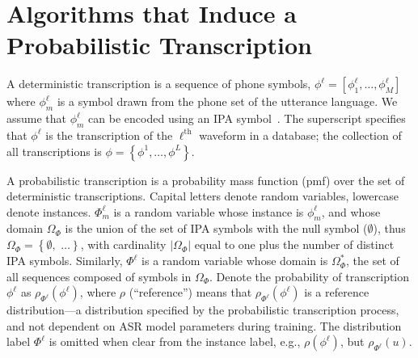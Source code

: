 \section{Algorithms that Induce a Probabilistic Transcription}

A deterministic transcription is a sequence of phone symbols,
$\phi^\ell =[\phi_1^\ell,\ldots,\phi_M^\ell]$ where $\phi_m^\ell$ is a
symbol drawn from the phone set of the utterance language.  We assume
that $\phi_m^\ell$ can be encoded using an IPA symbol~\cite{ipa1993}.
The superscript specifies that $\phi^\ell$ is the transcription of the
$\ell^{\textrm{th}}$ waveform in a database; the collection of all
transcriptions is $\phi=\left\{\phi^1,\ldots,\phi^L\right\}$.

A probabilistic transcription is a probability mass function (pmf)
over the set of deterministic transcriptions.  Capital letters denote
random variables, lowercase denote instances.  $\Phi^{\ell}_m$ is a
random variable whose instance is $\phi_m^\ell$, and whose domain
$\Omega_\Phi$ is the union of the set of IPA symbols with the null
symbol ($\emptyset$), thus $\Omega_\Phi=\left\{\right.\emptyset,$
\ipa{[a],[i],[2],[\ae],}$\left.\ldots\right\}$, with cardinality
$|\Omega_\Phi|$ equal to one plus the number of distinct IPA symbols.
Similarly, $\Phi^{\ell}$ is a random variable whose domain is
$\Omega_\Phi^*$, the set of all sequences composed of symbols in
$\Omega_\Phi$.  Denote the probability of transcription $\phi^{\ell}$
as $\rho_{\Phi^\ell}(\phi^{\ell})$, where $\rho$ (``reference'') means
that $\rho_{\Phi^\ell}(\phi^{\ell})$ is a reference distribution---a
distribution specified by the probabilistic transcription process, and
not dependent on ASR model parameters during training.  The
distribution label $\Phi^\ell$ is omitted when clear from the instance
label, e.g., $\rho(\phi^\ell)$, but $\rho_{\Phi^\ell}(u)$.
